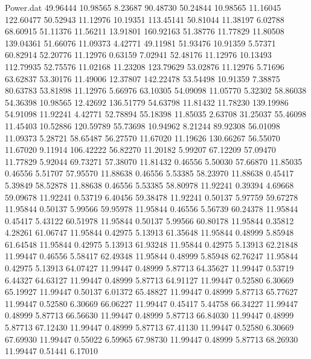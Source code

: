 \begin{filecontents}{Power.dat}
  49.96444   10.98565    8.23687   90.48730
  50.24844   10.98565   11.16045  122.60477
  50.52943   11.12976   10.19351  113.45141
  50.81044   11.38197    6.02788   68.60915
  51.11376   11.56211   13.91801  160.92163
  51.38776   11.77829   11.80508  139.04361
  51.66076   11.09373    4.42771   49.11981
  51.93476   10.91359    5.57371   60.82914
  52.20776   11.12976    0.63159    7.02941
  52.48176   11.12976   10.13493  112.79935
  52.75576   11.02168   11.23208  123.79629
  53.02876   11.12976    5.71696   63.62837
  53.30176   11.49006   12.37807  142.22478
  53.54498   10.91359    7.38875   80.63783
  53.81898   11.12976    5.66976   63.10305
  54.09098   11.05770    5.32302   58.86038
  54.36398   10.98565   12.42692  136.51779
  54.63798   11.81432   11.78230  139.19986
  54.91098   11.92241    4.42771   52.78894
  55.18398   11.85035    2.63708   31.25037
  55.46098   11.45403   10.52886  120.59789
  55.73698   10.94962    8.21244   89.92308
  56.01098   11.09373    5.28721   58.65487
  56.27570   11.67020   11.19626  130.66267
  56.55070   11.67020    9.11914  106.42222
  56.82270   11.20182    5.99207   67.12209
  57.09470   11.77829    5.92044   69.73271
  57.38070   11.81432    0.46556    5.50030
  57.66870   11.85035    0.46556    5.51707
  57.95570   11.88638    0.46556    5.53385
  58.23970   11.88638    0.45417    5.39849
  58.52878   11.88638    0.46556    5.53385
  58.80978   11.92241    0.39394    4.69668
  59.09678   11.92241    0.53719    6.40456
  59.38478   11.92241    0.50137    5.97759
  59.67278   11.95844    0.50137    5.99566
  59.95978   11.95844    0.46556    5.56739
  60.24378   11.95844    0.45417    5.43122
  60.51978   11.95844    0.50137    5.99566
  60.80178   11.95844    0.35812    4.28261
  61.06747   11.95844    0.42975    5.13913
  61.35648   11.95844    0.48999    5.85948
  61.64548   11.95844    0.42975    5.13913
  61.93248   11.95844    0.42975    5.13913
  62.21848   11.99447    0.46556    5.58417
  62.49348   11.95844    0.48999    5.85948
  62.76247   11.95844    0.42975    5.13913
  64.07427   11.99447    0.48999    5.87713
  64.35627   11.99447    0.53719    6.44327
  64.63127   11.99447    0.48999    5.87713
  64.91127   11.99447    0.52580    6.30669
  65.19927   11.99447    0.50137    6.01372
  65.48827   11.99447    0.48999    5.87713
  65.77627   11.99447    0.52580    6.30669
  66.06227   11.99447    0.45417    5.44758
  66.34227   11.99447    0.48999    5.87713
  66.56630   11.99447    0.48999    5.87713
  66.84030   11.99447    0.48999    5.87713
  67.12430   11.99447    0.48999    5.87713
  67.41130   11.99447    0.52580    6.30669
  67.69930   11.99447    0.55022    6.59965
  67.98730   11.99447    0.48999    5.87713
  68.26930   11.99447    0.51441    6.17010
\end{filecontents}
